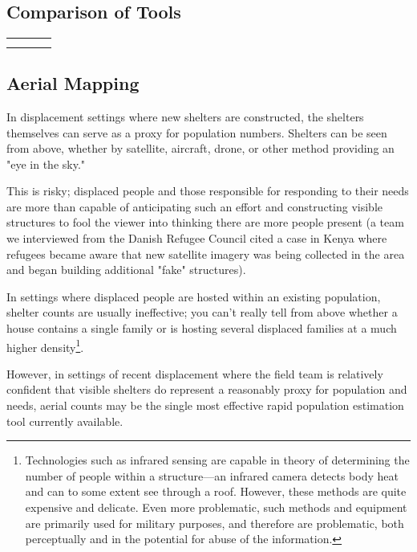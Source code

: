 \documentclass[a4paper,12pt,twoside]{article}
\begin{document}
\subsection{Comparison of Tools}

\begin{center}
\begin{tabular}{c|c|c|c}
     &  \\
     & 
\end{tabular}    
\end{center}


\subsection{Aerial Mapping}
In displacement settings where new shelters are constructed, the shelters themselves can serve as a proxy for population numbers. Shelters can be seen from above, whether by satellite, aircraft, drone, or other method providing an "eye in the sky." 

This is risky; displaced people and those responsible for responding to their needs are more than capable of anticipating such an effort and constructing visible structures to fool the viewer into thinking there are more people present (a team we interviewed from the Danish Refugee Council cited a case in Kenya where refugees became aware that new satellite imagery was being collected in the area and began building additional "fake" structures).

In settings where displaced people are hosted within an existing population, shelter counts are usually ineffective; you can't really tell from above whether a house contains a single family or is hosting several displaced families at a much higher density\footnote{Technologies such as infrared sensing are capable in theory of determining the number of people within a structure---an infrared camera detects body heat and can to some extent see through a roof. However, these methods are quite expensive and delicate. Even more problematic, such methods and equipment are primarily used for military purposes, and therefore are problematic, both perceptually and in the potential for abuse of the information.}. 

However, in settings of recent displacement where the field team is relatively confident that visible shelters do represent a reasonably proxy for population and needs, aerial counts may be the single most effective rapid population estimation tool currently available. 
\end{document}

